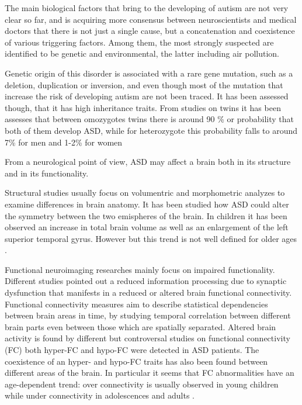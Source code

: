 \documentclass[11pt]{report}
\begin{document}
The main biological factors that bring to the developing of autism are not very clear so far, and is acquiring more consensus between neuroscientists and medical doctors that there is not just a single cause, but a concatenation and coexistence of various triggering factors.
Among them, the most strongly suspected are identified to be genetic and environmental, the latter including air pollution.

Genetic origin of this disorder is associated with a rare gene mutation, such as a deletion, duplication or inversion, and even though most of the mutation that increase the risk of developing autism are not been traced.
It has been assessed though, that it has high inheritance traits. From studies on twins it has been assesses that between omozygotes twins there is around 90 \% or probability that both of them develop ASD, while for heterozygote this probability falls to around 7\% for men and 1-2\% for women
\cite{freitag-2007}

From a neurological point of view, ASD may affect a brain both in its structure and in its functionality.

Structural studies usually focus on volumentric and morphometric analyzes to examine differences in brain anatomy.
It has been studied how ASD could alter the symmetry between the two emispheres \cite{postema2019} of the brain. In children it has been observed an increase in total brain volume as well as an enlargement of the left superior temporal gyrus. However but this trend is not well defined for older ages \cite{riddle-2017}.


Functional neuroimaging researches mainly focus on impaired functionality. Different studies pointed out a reduced information processing due to synaptic dysfunction that manifests in a reduced or altered brain functional connectivity.
Functional connectivity measures aim to describe statistical dependencies between brain areas in time, by studying temporal correlation between different brain parts even between those which are spatially separated.
Altered brain activity is found by different but controversal studies on functional connectivity (FC) both hyper-FC and hypo-FC were detected in ASD patients. The coexistence of an hyper- and hypo-FC traits has also been found between different areas of the brain.
In particular it seems that FC abnormalities have an age-dependent trend: over connectivity is usually observed in young children while under connectivity in adolescences and adults \cite{supekar-2013} \cite{spera-2019}.
\end{document}
